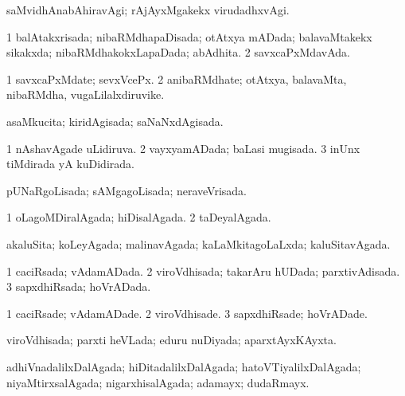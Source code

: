 \bentry
{} 
\gl{\kirxvi}
\expl{}
\bmng
 saMvidhAnabAhiravAgi; rAjAyxMgakekx virudadhxvAgi. 
\emng
\eentry

\bentry
{} 
\gl{\gu}
\expl{}
\bmng
\bnum
\num{1} balAtakxrisada; nibaRMdhapaDisada; otAtxya mADada; balavaMtakekx sikakxda; nibaRMdhakokxLapaDada; abAdhita. 
\num{2} savxcaPxMdavAda. 
\enum
\emng
\eentry

\bentry
{} 
\gl{\nA}
\expl{}
\bmng
\bnum
\num{1} savxcaPxMdate; sevxVcePx. 
\num{2} anibaRMdhate; otAtxya, balavaMta, nibaRMdha, \mo vugaLilalxdiruvike. 
\enum
\emng
\eentry

\bentry
{} 
\gl{\gu}
\expl{}
\bmng
 asaMkucita; kiridAgisada; saNaNxdAgisada. 
\emng
\eentry

\bentry
{} 
\gl{\gu}
\expl{}
\bmng
\bnum
\num{1} nAshavAgade uLidiruva. 
\num{2} vayxyamADada; baLasi mugisada. 
\num{3} inUnx tiMdirada yA kuDidirada. 
\enum
\emng
\eentry

\bentry
{} 
\gl{\gu}
\expl{}
\bmng
 pUNaRgoLisada; sAMgagoLisada; neraveVrisada. 
\emng
\eentry

\bentry
{} 
\gl{\gu}
\expl{}
\bmng
\bnum
\num{1} oLagoMDiralAgada; hiDisalAgada. 
\num{2} taDeyalAgada. 
\enum
\emng
\eentry

\bentry
{} 
\gl{\gu}
\expl{}
\bmng
 akaluSita; koLeyAgada; malinavAgada; kaLaMkitagoLaLxda; kaluSitavAgada. 
\emng
\eentry

\bentry
{} 
\gl{\gu}
\expl{}
\bmng
\bnum
\num{1} caciRsada; vAdamADada. 
\num{2} viroVdhisada; takarAru hUDada; parxtivAdisada. 
\num{3} sapxdhiRsada; hoVrADada. 
\enum
\emng
\eentry

\bentry
{} 
\gl{\kirxvi}
\expl{}
\bmng
\bnum
\num{1} caciRsade; vAdamADade. 
\num{2} viroVdhisade. 
\num{3} sapxdhiRsade; hoVrADade. 
\enum
\emng
\eentry

\bentry
{} 
\gl{\gu}
\expl{}
\bmng
 viroVdhisada; parxti heVLada; eduru nuDiyada; aparxtAyxKAyxta. 
\emng
\eentry

\bentry
{} 
\gl{\gu}
\expl{}
\bmng
 adhiVnadalilxDalAgada; hiDitadalilxDalAgada; hatoVTiyalilxDalAgada; niyaMtirxsalAgada; nigarxhisalAgada; adamayx; dudaRmayx. 
\emng
\eentry

